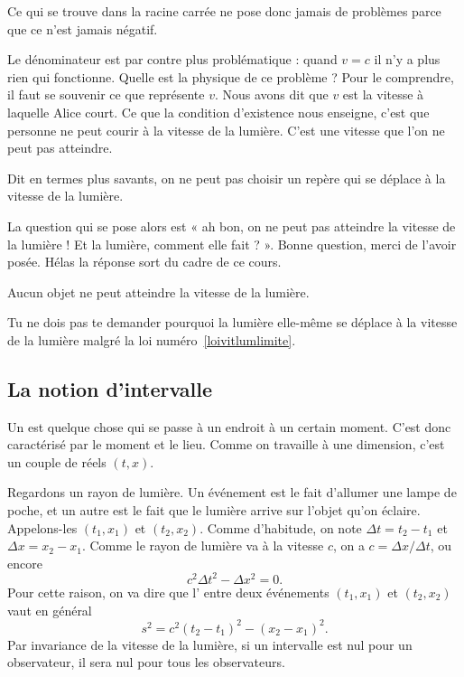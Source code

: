 Ce qui se trouve dans la racine carrée ne pose donc jamais de problèmes parce que ce n'est jamais négatif.

Le dénominateur est par contre plus problématique : quand \( v=c\) il n'y a plus rien qui fonctionne. Quelle est la physique de ce problème ? Pour le comprendre, il faut se souvenir ce que représente \( v\). Nous avons dit que \( v\) est la vitesse à laquelle Alice court. Ce que la condition d'existence nous enseigne, c'est que personne ne peut courir à la vitesse de la lumière. C'est une vitesse que l'on ne peut pas atteindre.

Dit en termes plus savants, on ne peut pas choisir un repère qui se déplace à la vitesse de la lumière.

La question qui se pose alors est « ah bon, on ne peut pas atteindre la vitesse de la lumière ! Et la lumière, comment elle fait ? ». Bonne question, merci de l'avoir posée. Hélas la réponse sort du cadre de ce cours.

\begin{loiphyz}\label{loivitlumlimite}
	Aucun objet ne peut atteindre la vitesse de la lumière.
\end{loiphyz}

\begin{loiphyz}
	Tu ne dois pas te demander pourquoi la lumière elle-même se déplace à la vitesse de la lumière malgré la loi numéro~\ref{loivitlumlimite}.
\end{loiphyz}

\subsection{La notion d'intervalle}


Un  est quelque chose qui se passe à un endroit à un certain moment. C'est donc caractérisé par le moment et le lieu. Comme on travaille à une dimension, c'est un couple de réels \( (t,x)\).

Regardons un rayon de lumière. Un événement est le fait d'allumer une lampe de poche, et un autre est le fait que le lumière arrive sur l'objet qu'on éclaire. Appelons-les \( (t_1,x_1)\) et \( (t_2,x_2)\). Comme d'habitude, on note \( \Delta t=t_2-t_1\) et \( \Delta x=x_2-x_1\). Comme le rayon de lumière va à la vitesse \( c\), on a \( c=\Delta x/\Delta t\), ou encore
\[
	c^2\Delta t^2-\Delta x^2=0.
\]
Pour cette raison, on va dire que l' entre deux événements \( (t_1,x_1)\) et \( (t_2,x_2)\) vaut en général
\begin{equation}
	s^2=c^2(t_2-t_1)^2-(x_2-x_1)^2.
\end{equation}
Par invariance de la vitesse de la lumière, si un intervalle est nul pour un observateur, il sera nul pour tous les observateurs.


